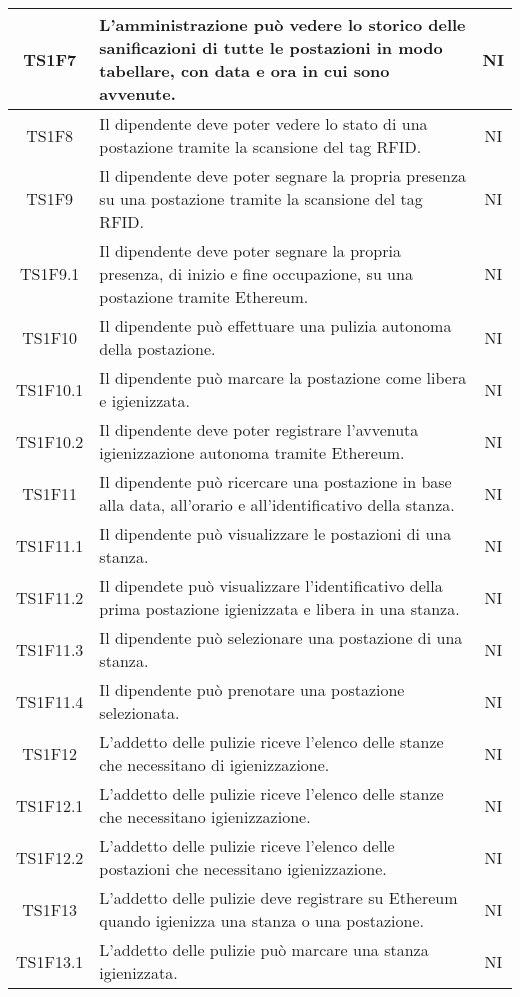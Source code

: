 \begin{center}
\begin{longtable}{|c|p{10cm}|c|}
			\hline
			TS1F7 & L'amministrazione può vedere lo storico delle sanificazioni di tutte le postazioni in modo tabellare, con data e ora in cui sono avvenute. & NI \\	
			\hline
			TS1F8 & Il dipendente deve poter vedere lo stato di una postazione tramite la scansione del tag RFID. & NI \\	
			\hline
			TS1F9 & Il dipendente deve poter segnare la propria presenza su una postazione tramite la scansione del tag RFID. & NI \\	
			\hline
			TS1F9.1 & Il dipendente deve poter segnare la propria presenza, di inizio e fine occupazione, su una postazione tramite Ethereum. & NI \\	
			\hline
			TS1F10 & Il dipendente può effettuare una pulizia autonoma della postazione. & NI \\	
			\hline
			TS1F10.1 & Il dipendente può marcare la postazione come libera e igienizzata. & NI \\	
			\hline
			TS1F10.2 & Il dipendente deve poter registrare l'avvenuta igienizzazione autonoma tramite Ethereum. & NI \\	
			\hline
			TS1F11 & Il dipendente può ricercare una postazione in base alla data, all'orario e all'identificativo della stanza. & NI \\	
			\hline
			TS1F11.1 & Il dipendente può visualizzare le postazioni di una stanza. & NI \\	
			\hline
			TS1F11.2 & Il dipendete può visualizzare l'identificativo della prima postazione igienizzata e libera in una stanza. & NI \\	
			\hline
			TS1F11.3 & Il dipendente può selezionare una postazione di una stanza. & NI \\	
			\hline
			TS1F11.4 & Il dipendente può prenotare una postazione selezionata. & NI \\	
			\hline
			TS1F12 & L'addetto delle pulizie riceve l'elenco delle stanze che necessitano di igienizzazione. & NI \\	
			\hline
			TS1F12.1 & L'addetto delle pulizie riceve l'elenco delle stanze che necessitano igienizzazione. & NI \\	
			\hline
			TS1F12.2 & L'addetto delle pulizie riceve l'elenco delle postazioni che necessitano igienizzazione. & NI \\	
			\hline
			TS1F13 & L'addetto delle pulizie deve registrare su Ethereum quando igienizza una stanza o una postazione. & NI \\	
			\hline
			TS1F13.1 & L'addetto delle pulizie può marcare una stanza igienizzata. & NI \\	

\end{longtable}
\end{center}

